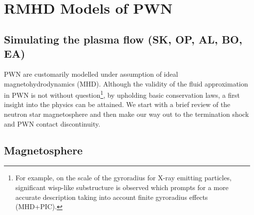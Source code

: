 \section{RMHD Models of PWN}
\label{sec:rmhd}
\subsection{Simulating the plasma flow         (SK, OP, AL, BO, EA)}
PWN are customarily modelled under assumption of ideal magnetohydrodynamics (MHD).  Although the validity of the fluid approximation in PWN is not without question\footnote{For example, on the scale of the gyroradius for X-ray emitting particles, significant wisp-like substructure is observed which prompts for a more accurate description taking into account finite gyroradius effects (MHD+PIC).}, by upholding basic conservation laws, a first insight into the physics can be attained.  We start with a brief review of the neutron star magnetosphere and then make our way out to the termination shock and PWN contact discontinuity. 

\subsection{Magnetosphere}

